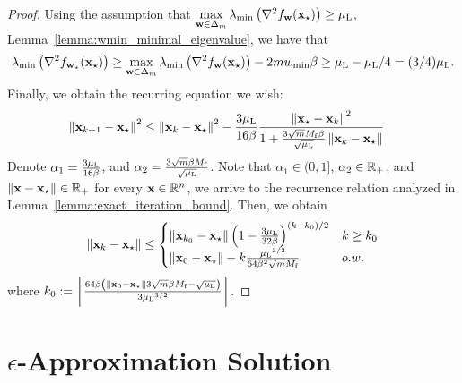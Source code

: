 \begin{proof}
Using the assumption that $\max\limits_{{\mathbf{w}}\in \Delta_m}\lambda_{\min}\left(\nabla^2 f_{{\mathbf{w}}}({\mathbf{x}}_\star)\right) \geq {\mu_{\mathrm{L}}}$, Lemma~\ref{lemma:wmin_minimal_eigenvalue}, we have that
\begin{align*}
    \lambda_{\min} \left(\nabla^2f_{{\mathbf{w}}_\star}({\mathbf{x}}_\star)\right)\geq \max\limits_{{\mathbf{w}}\in \Delta_m}\lambda_{\min}\left(\nabla^2 f_{{\mathbf{w}}}({\mathbf{x}}_\star)\right) - 2m{w_{\min}}\beta \geq {\mu_{\mathrm{L}}} - {\mu_{\mathrm{L}}}/4 = (3/4){\mu_{\mathrm{L}}}.
\end{align*}
Finally, we obtain the recurring equation we wish:
\begin{align*}
    \left\Vert{\mathbf{x}}_{k+1}-{\mathbf{x}}_\star\right\Vert^2 &\leq \left\Vert{\mathbf{x}}_k-{\mathbf{x}}_\star\right\Vert^2 -  \frac{3 {\mu_{\mathrm{L}}}}{16 \beta} \frac{ \left\Vert{\mathbf{x}}_\star - {\mathbf{x}}_k\right\Vert^2}{1+ \frac{3\sqrt{m} M_{\mathrm{f}} \beta}{\sqrt{{\mu_{\mathrm{L}}}}}  \left\Vert{\mathbf{x}}_k - {\mathbf{x}}_\star\right\Vert}
\end{align*} 
Denote $\alpha_1 = \frac{3{\mu_{\mathrm{L}}}}{16\beta}$, and $\alpha_2 = \frac{3\sqrt{m}\beta M_{\mathrm{f}}}{\sqrt{{\mu_{\mathrm{L}}}}}$. Note that $\alpha_1 \in (0,1]$, $\alpha_2 \in \mathbb{R}_+$, and $\left\Vert{\mathbf{x}}-{\mathbf{x}}_\star\right\Vert \in \mathbb{R}_+$ for every ${\mathbf{x}} \in \mathbb{R}^n$, we arrive to the recurrence relation analyzed in Lemma~\ref{lemma:exact_iteration_bound}. Then, we obtain
\begin{align*}
    \left\Vert{\mathbf{x}}_{k} - {\mathbf{x}}_\star\right\Vert \leq 
    \begin{cases}
        \left\Vert{\mathbf{x}}_{k_0} - {\mathbf{x}}_\star\right\Vert \left(1-\frac{3{\mu_{\mathrm{L}}}}{32\beta}\right)^{(k-k_0)/2}  & k\geq k_0\\
        \left\Vert{\mathbf{x}}_0 - {\mathbf{x}}_\star\right\Vert- k \frac{{\mu_{\mathrm{L}}}^{3/2}}{64 \beta^2 \sqrt{m} M_{\mathrm{f}}} & o.w.
    \end{cases}
\end{align*}
where $k_0 := \left\lceil \frac{64 \beta  \left(\left\Vert{\mathbf{x}}_0 - {\mathbf{x}}_\star\right\Vert 3\sqrt{m}\beta M_{\mathrm{f}} -\sqrt{{\mu_{\mathrm{L}}}}\right) }{ 3{\mu_{\mathrm{L}}}^{3/2}}\right\rceil$.
\end{proof}

\section{$\epsilon$-Approximation Solution}\label{app:epsilon_app_sol}


